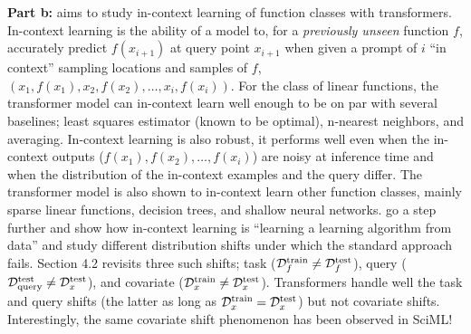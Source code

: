{\bf Part b:} \citep{garg2022can} aims to study in-context learning of function classes with transformers. In-context learning is the ability of a model to, for a {\it previously unseen} function $f$, accurately predict $f(x_{i+1})$ at query point $x_{i+1}$ when given a prompt of $i$ ``in context'' sampling locations and samples of $f$, $\left(x_1, f(x_1), x_2, f(x_2), \dots, x_i, f(x_i) \right)$. For the class of linear functions, the transformer model can in-context learn well enough to be on par with several baselines; least squares estimator (known to be optimal), n-nearest neighbors, and averaging. In-context learning is also robust, it performs well even when the in-context outputs ($f(x_1), f(x_2), \dots, f(x_i)$) are noisy at inference time and when the distribution of the in-context examples and the query differ. The transformer model is also shown to in-context learn other function classes, mainly sparse linear functions, decision trees, and shallow neural networks. \citep{zhang2024trained} go a step further and show how in-context learning is ``learning a learning algorithm from data'' and study different distribution shifts under which the standard approach fails. Section 4.2 revisits three such shifts; task ($\mathcal{D}_{f}^{\text{train}} \neq \mathcal{D}_{f}^{\text{test}}$), query ($\mathcal{D}_{\text{query}}^{\text{test}} \neq \mathcal{D}_{x}^{\text{test}}$), and covariate ($\mathcal{D}_{x}^{\text{train}} \neq \mathcal{D}_{x}^{\text{test}}$). Transformers handle well the task and query shifts (the latter as long as $\mathcal{D}_{x}^{\text{train}} = \mathcal{D}_{x}^{\text{test}}$) but not covariate shifts. Interestingly, the same covariate shift phenomenon has been observed in SciML!

